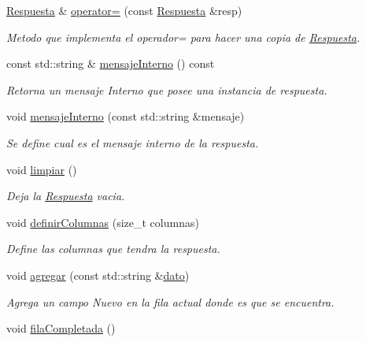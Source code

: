 \begin{DoxyCompactItemize}
\hyperlink{classRespuesta}{\-Respuesta} \& \hyperlink{classRespuesta_a46f8802b653802901e245bc766eb6896}{operator=} (const \hyperlink{classRespuesta}{\-Respuesta} \&resp)
\begin{DoxyCompactList}\small\item\em \-Metodo que implementa el operador= para hacer una copia de \hyperlink{classRespuesta}{\-Respuesta}. \end{DoxyCompactList}\item 
const std\-::string \& \hyperlink{classRespuesta_a562ba8b4160fdab0140ea475f1ea1b4a}{mensaje\-Interno} () const 
\begin{DoxyCompactList}\small\item\em \-Retorna un mensaje \-Interno que posee una instancia de respuesta. \end{DoxyCompactList}\item 
void \hyperlink{classRespuesta_ad500a86b29381a3728e43fb16ec25a6e}{mensaje\-Interno} (const std\-::string \&mensaje)
\begin{DoxyCompactList}\small\item\em \-Se define cual es el mensaje interno de la respuesta. \end{DoxyCompactList}\item 
\hypertarget{classRespuesta_a1e21c514d26c3385a5651a36d4f7f34a}{void \hyperlink{classRespuesta_a1e21c514d26c3385a5651a36d4f7f34a}{limpiar} ()}\label{classRespuesta_a1e21c514d26c3385a5651a36d4f7f34a}

\begin{DoxyCompactList}\small\item\em \-Deja la \hyperlink{classRespuesta}{\-Respuesta} vacia. \end{DoxyCompactList}\item 
void \hyperlink{classRespuesta_a35c60fc408efd0b7b092d28b5be69f44}{definir\-Columnas} (size\-\_\-t columnas)
\begin{DoxyCompactList}\small\item\em \-Define las columnas que tendra la respuesta. \end{DoxyCompactList}\item 
void \hyperlink{classRespuesta_ab8ac28c6ed5208dbc8c315fdf6b74185}{agregar} (const std\-::string \&\hyperlink{classRespuesta_ae774da66d9ba0886f93d2534a5b6f143}{dato})
\begin{DoxyCompactList}\small\item\em \-Agrega un campo \-Nuevo en la fila actual donde es que se encuentra. \end{DoxyCompactList}\item 
\hypertarget{classRespuesta_acab88cb460bb85a0e2d481a6259f6dda}{void \hyperlink{classRespuesta_acab88cb460bb85a0e2d481a6259f6dda}{fila\-Completada} ()}\label{classRespuesta_acab88cb460bb85a0e2d481a6259f6dda}


\end{DoxyCompactItemize}

